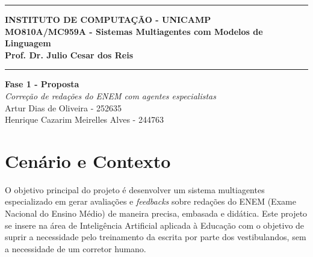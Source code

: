 \documentclass[12pt]{article}
\renewcommand{\headrulewidth}{0pt} %
\begin{document}
\vspace{5mm}
\hrule

\vspace{3mm}

\begin{center}
    {\large\textbf{INSTITUTO DE COMPUTAÇÃO - UNICAMP}} \\
    \vspace{3mm}
    {\large\textbf{MO810A/MC959A - Sistemas Multiagentes com Modelos de Linguagem}} \\
    \vspace{3mm}
    {\large\textbf{Prof. Dr. Julio Cesar dos Reis}}
\end{center}

\vspace{3mm}
\hrule

\vspace{2.5cm}
\begin{flushright}
    \Large{\textbf{Fase 1 - Proposta}} \\
    \vspace{1cm}
    \textit{
        Correção de redações do ENEM com agentes especialistas \\
    }
    \vspace{5cm}
    Artur Dias de Oliveira - 252635 \\
    Henrique Cazarim Meirelles Alves - 244763
\end{flushright}



\newpage
\pagestyle{fancy} %
\fancyhf{} %
\renewcommand{\headrulewidth}{0pt} %

\fancyfoot[R]{\thepage}



\section{Cenário e Contexto}
\label{sec:contexto}

O objetivo principal do projeto é desenvolver um sistema multiagentes especializado em gerar avaliações e \textit{feedbacks} sobre redações do ENEM (Exame Nacional do Ensino Médio) de maneira precisa, embasada e didática. Este projeto se insere na área de Inteligência Artificial aplicada à Educação com o objetivo de suprir a necessidade pelo treinamento da escrita por parte dos vestibulandos, sem a necessidade de um corretor humano.
\end{document}
